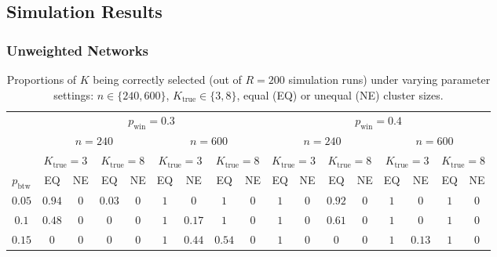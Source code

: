 \documentclass[12pt, titlepage, reqno]{article}
\begin{document}
\subsection{Simulation Results}
\label{sec:sim_res}

\subsubsection{Unweighted Networks}
\label{sec:unweighted_res}

\begin{table}[tbp]
	\centering
	\renewcommand{\arraystretch}{1.5}
	\caption{Proportions of $K$ being correctly selected (out of $R 
		= 200$ simulation runs) under varying parameter settings: $n 
		\in \{240, 600\}$, $K_{\text{true}} 
		\in \{3, 8\}$, equal (EQ) or unequal (NE) cluster sizes.} 
	\label{tab:unweighted_n240_600}
	\small
	\setlength{\tabcolsep}{4.5pt}
	\begin{tabular}{c cccc cccc cccc cccc}
		\toprule
		& \multicolumn{8}{c}{$p_{\text{win}} = 0.3$} & 
		\multicolumn{8}{c}{$p_{\text{win}} = 0.4$} \\
		\cmidrule(lr){2-9} \cmidrule(lr){10-17} 
		& \multicolumn{4}{c}{$n = 240$} & \multicolumn{4}{c}{$n = 
		600$} & \multicolumn{4}{c}{$n = 240$} & 
		\multicolumn{4}{c}{$n = 600$} \\
		\cmidrule(lr){2-5} \cmidrule(lr){6-9} \cmidrule(lr){10-13} 
		\cmidrule(lr){14-17}
		& \multicolumn{2}{c}{$K_{\text{true}} = 3$} & 
		\multicolumn{2}{c}{$K_{\text{true}} = 8$} 
		& \multicolumn{2}{c}{$K_{\text{true}} = 3$} & 
		\multicolumn{2}{c}{$K_{\text{true}} = 8$}
		& \multicolumn{2}{c}{$K_{\text{true}} = 3$} & 
		\multicolumn{2}{c}{$K_{\text{true}} = 8$}
		& \multicolumn{2}{c}{$K_{\text{true}} = 3$} & 
		\multicolumn{2}{c}{$K_{\text{true}} = 8$} \\
		\cmidrule(lr){2-3} \cmidrule(lr){4-5} \cmidrule(lr){6-7} 
		\cmidrule(lr){8-9}
		\cmidrule(lr){10-11} \cmidrule(lr){12-13} 
		\cmidrule(lr){14-15} \cmidrule(lr){16-17}
		$p_{\text{btw}}$ & EQ & NE & EQ & NE & EQ & NE & EQ & NE 
		& EQ & NE & EQ & NE & EQ & NE & EQ & NE \\
		\midrule
		$0.05$ & $0.94$ & $0$ & $0.03$ & $0$ & $1$ & $0$ & $1$ & $0$ 
		& 
		$1$ & $0$ & $0.92$ & $0$ & $1$ & $0$ & $1$ & $0$ \\
		$0.1$ & $0.48$ & $0$ & $0$ & $0$ & $1$ & $0.17$ & $1$ & $0$ 
		& 
		$1$ & $0$ & $0.61$ & $0$ & $1$ & $0$ & $1$ & $0$ \\
		$0.15$ & $0$ & $0$ & $0$ & $0$ & $1$ & $0.44$ & $0.54$ & $0$ 
		& 
		$1$ & $0$ & $0$ & $0$ & $1$ & $0.13$ & $1$ & $0$ \\

\end{tabular}
\end{table}
\end{document}
